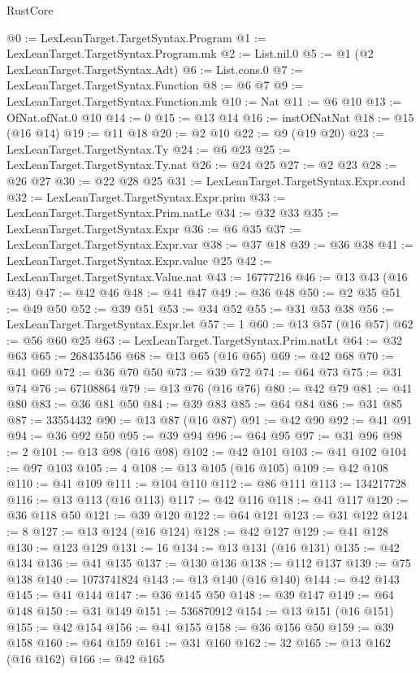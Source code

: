 \begin{lexlean}{RustCore}
\begin{coremodule}
@0 := LexLeanTarget.TargetSyntax.Program
@1 := LexLeanTarget.TargetSyntax.Program.mk
@2 := List.nil.{0}
@5 := @1 (@2 LexLeanTarget.TargetSyntax.Adt)
@6 := List.cons.{0}
@7 := LexLeanTarget.TargetSyntax.Function
@8 := @6 @7
@9 := LexLeanTarget.TargetSyntax.Function.mk
@10 := Nat
@11 := @6 @10
@13 := OfNat.ofNat.{0} @10
@14 := 0
@15 := @13 @14
@16 := instOfNatNat
@18 := @15 (@16 @14)
@19 := @11 @18
@20 := @2 @10
@22 := @9 (@19 @20)
@23 := LexLeanTarget.TargetSyntax.Ty
@24 := @6 @23
@25 := LexLeanTarget.TargetSyntax.Ty.nat
@26 := @24 @25
@27 := @2 @23
@28 := @26 @27
@30 := @22 @28 @25
@31 := LexLeanTarget.TargetSyntax.Expr.cond
@32 := LexLeanTarget.TargetSyntax.Expr.prim
@33 := LexLeanTarget.TargetSyntax.Prim.natLe
@34 := @32 @33
@35 := LexLeanTarget.TargetSyntax.Expr
@36 := @6 @35
@37 := LexLeanTarget.TargetSyntax.Expr.var
@38 := @37 @18
@39 := @36 @38
@41 := LexLeanTarget.TargetSyntax.Expr.value @25
@42 := LexLeanTarget.TargetSyntax.Value.nat
@43 := 16777216
@46 := @13 @43 (@16 @43)
@47 := @42 @46
@48 := @41 @47
@49 := @36 @48
@50 := @2 @35
@51 := @49 @50
@52 := @39 @51
@53 := @34 @52
@55 := @31 @53 @38
@56 := LexLeanTarget.TargetSyntax.Expr.let
@57 := 1
@60 := @13 @57 (@16 @57)
@62 := @56 @60 @25
@63 := LexLeanTarget.TargetSyntax.Prim.natLt
@64 := @32 @63
@65 := 268435456
@68 := @13 @65 (@16 @65)
@69 := @42 @68
@70 := @41 @69
@72 := @36 @70 @50
@73 := @39 @72
@74 := @64 @73
@75 := @31 @74
@76 := 67108864
@79 := @13 @76 (@16 @76)
@80 := @42 @79
@81 := @41 @80
@83 := @36 @81 @50
@84 := @39 @83
@85 := @64 @84
@86 := @31 @85
@87 := 33554432
@90 := @13 @87 (@16 @87)
@91 := @42 @90
@92 := @41 @91
@94 := @36 @92 @50
@95 := @39 @94
@96 := @64 @95
@97 := @31 @96
@98 := 2
@101 := @13 @98 (@16 @98)
@102 := @42 @101
@103 := @41 @102
@104 := @97 @103
@105 := 4
@108 := @13 @105 (@16 @105)
@109 := @42 @108
@110 := @41 @109
@111 := @104 @110
@112 := @86 @111
@113 := 134217728
@116 := @13 @113 (@16 @113)
@117 := @42 @116
@118 := @41 @117
@120 := @36 @118 @50
@121 := @39 @120
@122 := @64 @121
@123 := @31 @122
@124 := 8
@127 := @13 @124 (@16 @124)
@128 := @42 @127
@129 := @41 @128
@130 := @123 @129
@131 := 16
@134 := @13 @131 (@16 @131)
@135 := @42 @134
@136 := @41 @135
@137 := @130 @136
@138 := @112 @137
@139 := @75 @138
@140 := 1073741824
@143 := @13 @140 (@16 @140)
@144 := @42 @143
@145 := @41 @144
@147 := @36 @145 @50
@148 := @39 @147
@149 := @64 @148
@150 := @31 @149
@151 := 536870912
@154 := @13 @151 (@16 @151)
@155 := @42 @154
@156 := @41 @155
@158 := @36 @156 @50
@159 := @39 @158
@160 := @64 @159
@161 := @31 @160
@162 := 32
@165 := @13 @162 (@16 @162)
@166 := @42 @165

\end{coremodule}
\end{lexlean}
